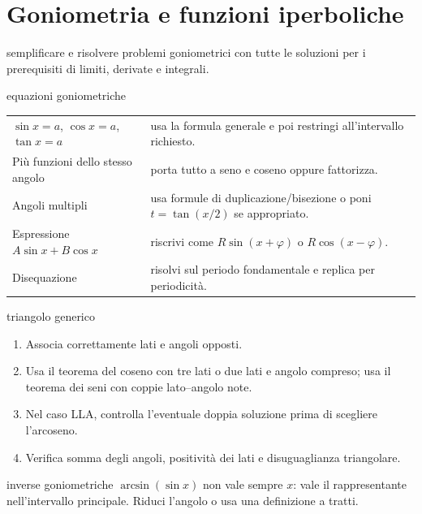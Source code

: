 \chapter{Goniometria e funzioni iperboliche}
\label{chap:4}

\begin{obiettivocapitolo}{semplificare e risolvere problemi goniometrici con tutte le soluzioni}
\prioritaalta per i prerequisiti di limiti, derivate e integrali.
\end{obiettivocapitolo}
\begin{sceltametodo}{equazioni goniometriche}
\begin{tabularx}{\textwidth}{@{}p{}X@{}}
$\sin x=a$, $\cos x=a$, $\tan x=a$ & usa la formula generale e poi restringi all'intervallo richiesto.\\
Più funzioni dello stesso angolo & porta tutto a seno e coseno oppure fattorizza.\\
Angoli multipli & usa formule di duplicazione/bisezione o poni $t=\tan(x/2)$ se appropriato.\\
Espressione $A\sin x+B\cos x$ & riscrivi come $R\sin(x+\varphi)$ o $R\cos(x-\varphi)$.\\
Disequazione & risolvi sul periodo fondamentale e replica per periodicità.
\end{tabularx}
\end{sceltametodo}
\begin{proceduraesame}{triangolo generico}
\begin{enumerate}
\item Associa correttamente lati e angoli opposti.
\item Usa il teorema del coseno con tre lati o due lati e angolo compreso; usa il teorema dei seni con coppie lato--angolo note.
\item Nel caso LLA, controlla l'eventuale doppia soluzione prima di scegliere l'arcoseno.
\item Verifica somma degli angoli, positività dei lati e disuguaglianza triangolare.
\end{enumerate}
\end{proceduraesame}
\begin{errorefrequente}{inverse goniometriche}
$\arcsin(\sin x)$ non vale sempre $x$: vale il rappresentante nell'intervallo principale. Riduci l'angolo o usa una definizione a tratti.
\end{errorefrequente}


